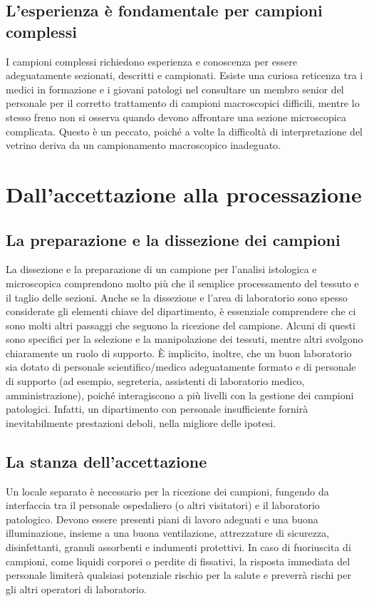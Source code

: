 \subsection{L'esperienza è fondamentale per campioni complessi}
I campioni complessi richiedono esperienza e conoscenza per essere adeguatamente sezionati, descritti e campionati. Esiste una curiosa reticenza tra i medici in formazione e i giovani patologi nel consultare un membro senior del personale per il corretto trattamento di campioni macroscopici difficili, mentre lo stesso freno non si osserva quando devono affrontare una sezione microscopica complicata. Questo è un peccato, poiché a volte la difficoltà di interpretazione del vetrino deriva da un campionamento macroscopico inadeguato.

\section{Dall'accettazione alla processazione}


\subsection{La preparazione e la dissezione dei campioni}
La dissezione e la preparazione di un campione per l'analisi istologica e microscopica comprendono molto più che il semplice processamento del tessuto e il taglio delle sezioni. Anche se la dissezione e l'area di laboratorio sono spesso considerate gli elementi chiave del dipartimento, è essenziale comprendere che ci sono molti altri passaggi che seguono la ricezione del campione. Alcuni di questi sono specifici per la selezione e la manipolazione dei tessuti, mentre altri svolgono chiaramente un ruolo di supporto. È implicito, inoltre, che un buon laboratorio sia dotato di personale scientifico/medico adeguatamente formato e di personale di supporto (ad esempio, segreteria, assistenti di laboratorio medico, amministrazione), poiché interagiscono a più livelli con la gestione dei campioni patologici. Infatti, un dipartimento con personale insufficiente fornirà inevitabilmente prestazioni deboli, nella migliore delle ipotesi.

\subsection{La stanza dell'accettazione}
Un locale separato è necessario per la ricezione dei campioni, fungendo da interfaccia tra il personale ospedaliero (o altri visitatori) e il laboratorio patologico. Devono essere presenti piani di lavoro adeguati e una buona illuminazione, insieme a una buona ventilazione, attrezzature di sicurezza, disinfettanti, granuli assorbenti e indumenti protettivi. In caso di fuoriuscita di campioni, come liquidi corporei o perdite di fissativi, la risposta immediata del personale limiterà qualsiasi potenziale rischio per la salute e preverrà rischi per gli altri operatori di laboratorio.

